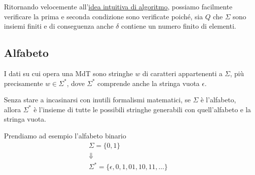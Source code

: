 Ritornando velocemente
all'\hyperref[sec: algoritmo]{idea intuitiva di algoritmo},
possiamo facilmente verificare la prima e seconda condizione
sono verificate poiché, sia $Q$ che $\Sigma$ sono insiemi
finiti e di conseguenza anche $\delta$ contiene un numero
finito di elementi.

\subsection{Alfabeto}
I dati su cui opera una MdT sono stringhe $w$ di caratteri
appartenenti a $\Sigma$, più precisamente $w \in \Sigma^*$,
dove $\Sigma^*$ comprende anche la stringa vuota $\epsilon$.

Senza stare a incasinarsi con inutili formalismi matematici,
se $\Sigma$ è l'alfabeto, allora $\Sigma^*$ è l'insieme di
tutte le possibili stringhe generabili con quell'alfabeto e
la stringa vuota.

\begin{example}
	Prendiamo ad esempio l'alfabeto binario
	\begin{gather*}
		\Sigma = \{ 0, 1 \} \\
		\Downarrow \\
		\Sigma^* = \{ \epsilon, 0, 1, 01, 10, 11, \dots \}
	\end{gather*}
\end{example}